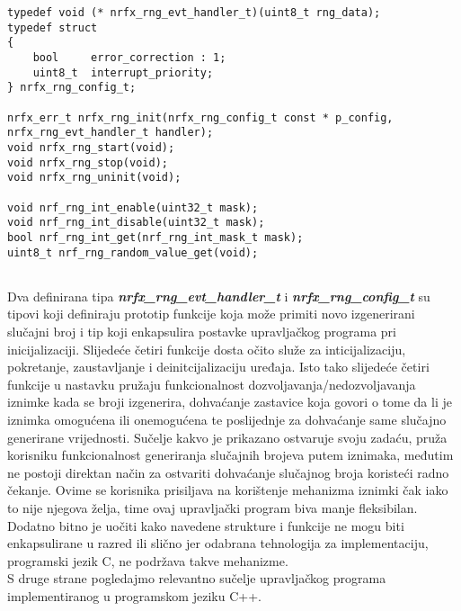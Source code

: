 \lstset{language=C, tabsize=2, frame=single, breaklines=true, showstringspaces=false}
\begin{lstlisting}
typedef void (* nrfx_rng_evt_handler_t)(uint8_t rng_data);
typedef struct
{
    bool     error_correction : 1;
    uint8_t  interrupt_priority;
} nrfx_rng_config_t;

nrfx_err_t nrfx_rng_init(nrfx_rng_config_t const * p_config, nrfx_rng_evt_handler_t handler);
void nrfx_rng_start(void);
void nrfx_rng_stop(void);
void nrfx_rng_uninit(void);

void nrf_rng_int_enable(uint32_t mask);
void nrf_rng_int_disable(uint32_t mask);
bool nrf_rng_int_get(nrf_rng_int_mask_t mask);
uint8_t nrf_rng_random_value_get(void);
          
\end{lstlisting}
Dva definirana tipa \textbf{\textit{nrfx\_rng\_evt\_handler\_t}} i \textbf{\textit{nrfx\_rng\_config\_t}} su tipovi koji definiraju prototip funkcije koja može primiti novo izgenerirani slučajni broj i tip koji enkapsulira postavke upravljačkog programa pri inicijalizaciji. Slijedeće četiri funkcije dosta očito služe za inticijalizaciju, pokretanje, zaustavljanje i deinitcijalizaciju uređaja. Isto tako slijedeće četiri funkcije u nastavku pružaju funkcionalnost dozvoljavanja/nedozvoljavanja iznimke kada se broji izgenerira, dohvaćanje zastavice koja govori o tome da li je iznimka omogućena ili onemogućena te poslijednje za dohvaćanje same slučajno generirane vrijednosti. Sučelje kakvo je prikazano ostvaruje svoju zadaću, pruža korisniku funkcionalnost generiranja slučajnih brojeva putem iznimaka, međutim ne postoji direktan način za ostvariti dohvaćanje slučajnog broja koristeći radno čekanje. Ovime se korisnika prisiljava na korištenje mehanizma iznimki čak iako to nije njegova želja, time ovaj upravljački program biva manje fleksibilan. Dodatno bitno je uočiti kako navedene strukture i funkcije ne mogu biti enkapsulirane u razred ili slično jer odabrana tehnologija za implementaciju, programski jezik C, ne podržava takve mehanizme. \\
S druge strane pogledajmo relevantno sučelje upravljačkog programa implementiranog u programskom jeziku C++.
\lstset{language=C++, tabsize=2, frame=single, breaklines=true, showstringspaces=false}

